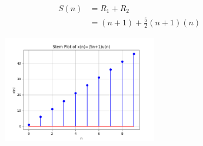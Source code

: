 \documentclass[journal,12pt,twocolumn]{IEEEtran}
\theoremstyle{remark}
\begin{document}
\begin{align}
 S(n) &= R_1 + R_2\\
    &= (n+1) + \frac{5}{2}(n+1)(n)
\end{align}
\begin{figure}[h]
  \centering
  \includegraphics[width=0.6\textwidth]{figs/stem2.png}
 
  \label{fig:Stem_Plot}
\end{figure}
\end{document}
